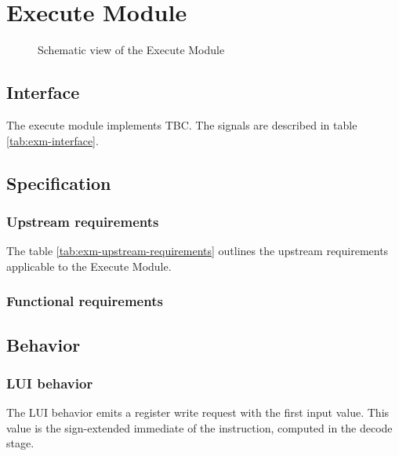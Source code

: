 \section{Execute Module}

  \begin{figure}[h!]
      \centering
      
      \caption{Schematic view of the Execute Module}
      \label{fig:exm}
    \end{figure}

  \subsection{Interface}

    \begin{content}
        The execute module implements TBC. The signals are described in table \ref{tab:exm-interface}. 
      \end{content}

    

  \subsection{Specification}

    \subsubsection{Upstream requirements}

      The table \ref{tab:exm-upstream-requirements} outlines the upstream requirements applicable to the Execute Module.

      

    \subsubsection{Functional requirements}

  \subsection{Behavior}

    \subsubsection{LUI behavior}

      \begin{content}
          The LUI behavior emits a register write request with the first input value. This value is the sign-extended immediate of the instruction, computed in the decode stage.
        \end{content}

